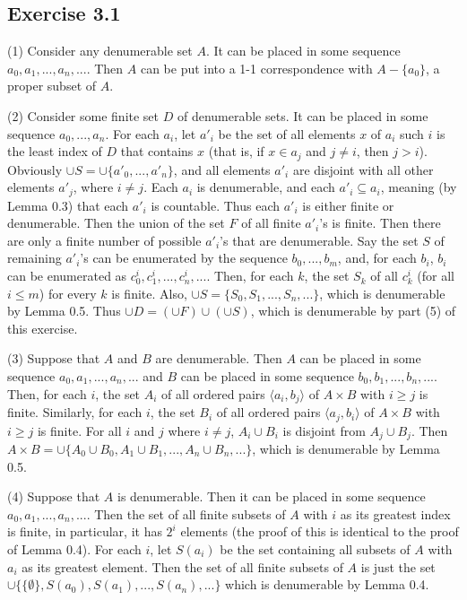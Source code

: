 \documentclass{article}
\theoremstyle{definition}
\begin{document}
\subsection*{Exercise 3.1}

(1) Consider any denumerable set $A$. It can be placed in some sequence $a_0,a_1,...,a_n,...$. Then $A$ can be put into a 1-1 correspondence 
with $A-\{a_0\}$, a proper subset of $A$.

(2) Consider some finite set $D$ of denumerable sets. It can be placed in some sequence $a_0,...,a_n$. For each 
$a_i$, let $a'_i$ be the set of all elements $x$ of $a_i$ such $i$ is the least index of $D$ that contains $x$ (that is, 
if $x\in a_j$ and $j\ne i$, then $j>i$). Obviously 
$\cup S=\cup\{a'_0,...,a'_n\}$, and all elements $a'_i$ are disjoint with all other elements $a'_j$, where $i\ne j$. Each 
$a_i$ is denumerable, and each $a'_i\subseteq a_i$, meaning (by Lemma 0.3) that each $a'_i$ is countable. Thus each $a'_i$ is either 
finite or denumerable. Then the union of the set $F$ of all finite $a'_i$'s is finite. Then there are only a finite number of 
possible $a'_i$'s that are denumerable. Say the set $S$ of remaining $a'_i$'s can be enumerated by the sequence $b_0,...,b_m$, and, for each 
$b_i$, $b_i$ can be enumerated as $c^i_0,c^i_1,...,c^i_n,...$. Then, for each $k$, the set $S_k$ of all $c^i_k$ (for all $i\le m$) 
for every $k$ is finite. Also, 
$\cup S=\{S_0,S_1,...,S_n,...\}$, which is denumerable by Lemma 0.5. Thus $\cup D=(\cup F)\cup (\cup S)$, which is denumerable by 
part (5) of this exercise.

(3) Suppose that $A$ and $B$ are denumerable. Then $A$ can be placed in some sequence $a_0,a_1,...,a_n,...$ and $B$ can be placed in some 
sequence $b_0,b_1,...,b_n,...$. Then, for each $i$, the set $A_i$ of all ordered pairs $\langle a_i,b_j\rangle$ of $A\times B$ with $i\ge j$ is finite. 
Similarly, for each $i$, the set $B_i$ of all ordered pairs $\langle a_j,b_i\rangle$ of $A\times B$ with $i\ge j$ is finite. For all $i$ and $j$ where 
$i\ne j$, $A_i\cup B_i$ is disjoint from $A_j\cup B_j$. Then 
$A\times B=\cup\{A_0\cup B_0,A_1\cup B_1,...,A_n\cup B_n,...\}$, which is denumerable by Lemma 0.5.

(4) Suppose that $A$ is denumerable. Then it can be placed in some sequence $a_0,a_1,...,a_n,...$. Then the set of all finite subsets of $A$ with $i$ as its greatest index
is finite, in particular, it has $2^i$ elements (the proof of this is identical to the proof of Lemma 0.4). 
For each $i$, let $S(a_i)$ be the set containing all subsets of $A$ with $a_i$ as its greatest element. 
Then the set of all finite subsets of $A$ is just the set $\cup\{\{\emptyset\},S(a_0),S(a_1),...,S(a_n),...\}$ which is denumerable by Lemma 0.4. 
\end{document}
